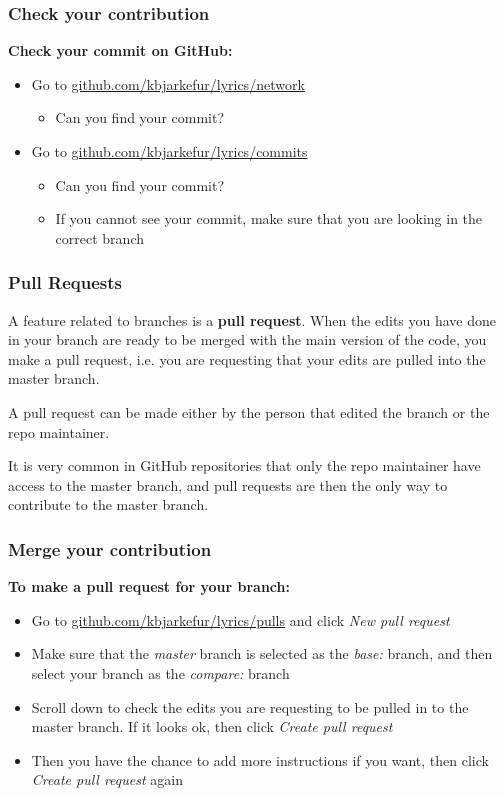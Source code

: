 \documentclass[aspectratio=169]{beamer} %
\newcommand{\trainingURL}[1]{{\color{blue}\url{#1}}}
\newcommand{\traininerUsername}{kbjarkefur}
\newcommand{\repoName}{\traininerUsername/lyrics}
\newcommand{\trainingRepoURL}[1]{\trainingURL{github.com/\repoName #1}}
\begin{document}
\begin{frame}
\frametitle{Check your contribution}

	\textbf{Check your commit on GitHub:}
	\begin{itemize}
		\item Go to \trainingRepoURL{/network}
		\begin{itemize}
			\item Can you find your commit?
		\end{itemize}
		\item Go to \trainingRepoURL{/commits}
		\begin{itemize}
			\item Can you find your commit?
			\item If you cannot see your commit, make sure that you are looking in the correct branch
		\end{itemize}
	\end{itemize}

\end{frame}

\begin{frame}
\frametitle{Pull Requests}

	A feature related to branches is a \textbf{pull request}. When the edits you have done in your branch are ready to be merged with the main version of the code, you make a pull request, i.e. you are requesting that your edits are pulled into the master branch.


	A pull request can be made either by the person that edited the branch or the repo maintainer.

	It is very common in GitHub repositories that only the repo maintainer have access to the master branch, and pull requests are then the only way to contribute to the master branch.


\end{frame}

\begin{frame}
\frametitle{Merge your contribution}

	\textbf{To make a pull request for your branch:}
	\begin{itemize}
		\item Go to \trainingRepoURL{/pulls} and click \textit{New pull request}
		\item Make sure that the \textit{master} branch is selected as the \textit{base:} branch, and then select your branch as the \textit{compare:} branch
		\item Scroll down to check the edits you are requesting to be pulled in to the master branch. If it looks ok, then click \textit{Create pull request}
		\item Then you have the chance to add more instructions if you want, then click \textit{Create pull request} again
	\end{itemize}
\end{frame}
\end{document}
